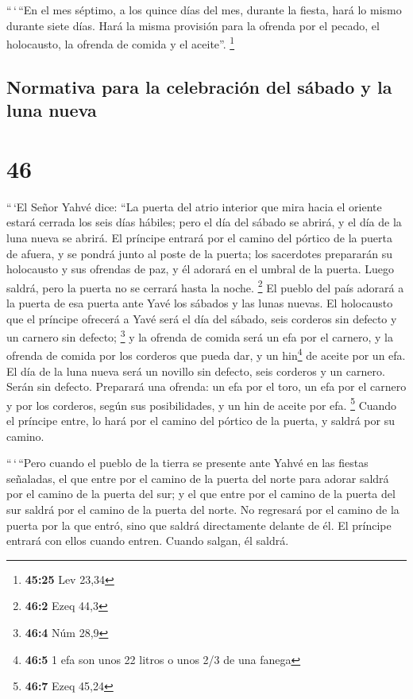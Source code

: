  ``\,`\,``En el mes séptimo, a los quince días del mes,
durante la fiesta, hará lo mismo durante siete días. Hará la misma
provisión para la ofrenda por el pecado, el holocausto, la ofrenda de
comida y el aceite''. \footnote{\textbf{45:25} Lev 23,34}

\hypertarget{normativa-para-la-celebraciuxf3n-del-suxe1bado-y-la-luna-nueva}{%
\subsection{Normativa para la celebración del sábado y la luna
nueva}\label{normativa-para-la-celebraciuxf3n-del-suxe1bado-y-la-luna-nueva}}

\hypertarget{section-45}{%
\section{46}\label{section-45}}

 ``\,`El Señor Yahvé dice: ``La puerta del atrio interior
que mira hacia el oriente estará cerrada los seis días hábiles; pero el
día del sábado se abrirá, y el día de la luna nueva se abrirá.
 El príncipe entrará por el camino del pórtico de la
puerta de afuera, y se pondrá junto al poste de la puerta; los
sacerdotes prepararán su holocausto y sus ofrendas de paz, y él adorará
en el umbral de la puerta. Luego saldrá, pero la puerta no se cerrará
hasta la noche. \footnote{\textbf{46:2} Ezeq 44,3}  El
pueblo del país adorará a la puerta de esa puerta ante Yavé los sábados
y las lunas nuevas.  El holocausto que el príncipe
ofrecerá a Yavé será el día del sábado, seis corderos sin defecto y un
carnero sin defecto; \footnote{\textbf{46:4} Núm 28,9}  y
la ofrenda de comida será un efa por el carnero, y la ofrenda de comida
por los corderos que pueda dar, y un hin\footnote{\textbf{46:5} 1 efa
  son unos 22 litros o unos 2/3 de una fanega} de aceite por un efa.
 El día de la luna nueva será un novillo sin defecto, seis
corderos y un carnero. Serán sin defecto.  Preparará una
ofrenda: un efa por el toro, un efa por el carnero y por los corderos,
según sus posibilidades, y un hin de aceite por efa. \footnote{\textbf{46:7}
  Ezeq 45,24}  Cuando el príncipe entre, lo hará por el
camino del pórtico de la puerta, y saldrá por su camino.

 ``\,`\,``Pero cuando el pueblo de la tierra se presente
ante Yahvé en las fiestas señaladas, el que entre por el camino de la
puerta del norte para adorar saldrá por el camino de la puerta del sur;
y el que entre por el camino de la puerta del sur saldrá por el camino
de la puerta del norte. No regresará por el camino de la puerta por la
que entró, sino que saldrá directamente delante de él. 
El príncipe entrará con ellos cuando entren. Cuando salgan, él saldrá.

